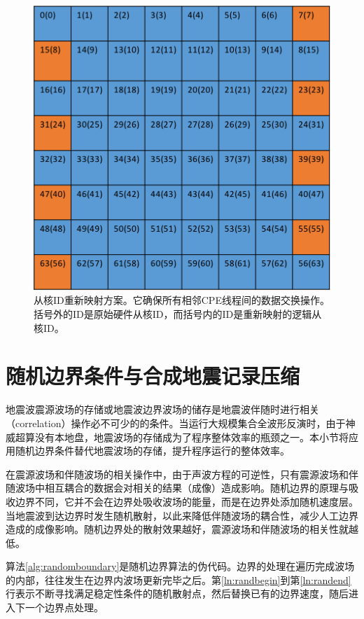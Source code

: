 \documentclass[degree=doctor]{thuthesis}
\begin{document}
\begin{figure}[ht]
\centering
\includegraphics[width=0.5\columnwidth]{awp_register_remap.png}
\caption{
从核ID重新映射方案。它确保所有相邻CPE线程间的数据交换操作。 括号外的ID是原始硬件从核ID，而括号内的ID是重新映射的逻辑从核ID。}
\label{fig:id-remapping}
\end{figure}




\section{随机边界条件与合成地震记录压缩} %
\label{sec:随机边界条件与合成地震记录压缩}

地震波震源波场的存储或地震波边界波场的储存是地震波伴随时进行相关（correlation）操作必不可少的的条件。当运行大规模集合全波形反演时，由于神威超算没有本地盘，地震波场的存储成为了程序整体效率的瓶颈之一。本小节将应用随机边界条件替代地震波场的存储，提升程序运行的整体效率。

在震源波场和伴随波场的相关操作中，由于声波方程的可逆性，只有震源波场和伴随波场中相互耦合的数据会对相关的结果（成像）造成影响。随机边界的原理与吸收边界不同，它并不会在边界处吸收波场的能量，而是在边界处添加随机速度层。当地震波到达边界时发生随机散射，以此来降低伴随波场的耦合性，减少人工边界造成的成像影响。随机边界处的散射效果越好，震源波场和伴随波场的相关性就越低。

算法\ref{alg:randomboundary}是随机边界算法的伪代码。边界的处理在遍历完成波场的内部，往往发生在边界内波场更新完毕之后。第\ref{ln:randbegin}到第\ref{ln:randend}行表示不断寻找满足稳定性条件的随机散射点，然后替换已有的边界速度，随后进入下一个边界点处理。
\end{document}
